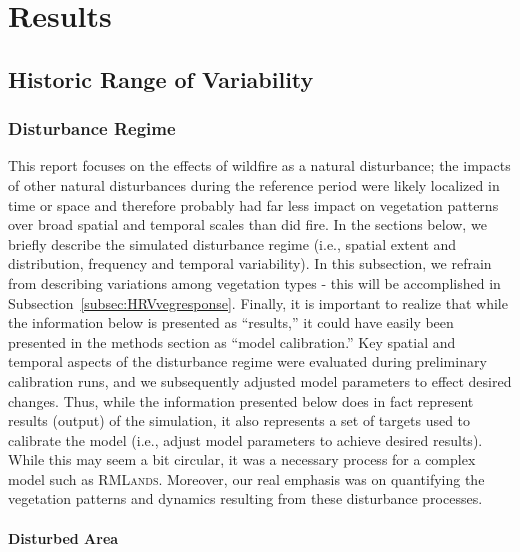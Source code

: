 \chapter{Results}

\section{Historic Range of Variability}

\subsection{Disturbance Regime}

This report focuses on the effects of wildfire as a natural disturbance; the impacts of other natural disturbances during the reference period were likely localized in time or space and therefore probably had far less impact on vegetation patterns over broad spatial and temporal scales than did fire. In the sections below, we briefly describe the simulated disturbance regime (i.e., spatial extent and distribution, frequency and temporal variability). In this subsection, we refrain from describing variations among vegetation types - this will be accomplished in Subsection~\ref{subsec:HRVvegresponse}. Finally, it is important to realize that while the information below is presented as ``results,'' it could have easily been presented in the methods section as ``model calibration.'' Key spatial and temporal aspects of the disturbance regime were evaluated during preliminary calibration runs, and we subsequently adjusted model parameters to effect desired changes. Thus, while the information presented below does in fact represent results (output) of the simulation, it also represents a set of targets used to calibrate the model (i.e., adjust model parameters to achieve desired results). While this may seem a bit circular, it was a necessary process for a complex model such as \textsc{RMLands}. Moreover, our real emphasis was on quantifying the vegetation patterns and dynamics resulting from these disturbance processes. 

\subsubsection{Disturbed Area}

